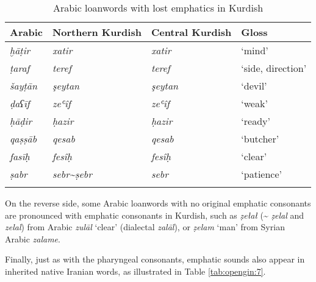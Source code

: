 \documentclass[output=paper]{langsci/langscibook}
\begin{document}
\begin{table}
\begin{tabular}{llll}
\lsptoprule
{Arabic} & {Northern Kurdish} & {Central Kurdish} & {Gloss}\\\midrule
\textit{ḫāṭir}  & \textit{xatir}                           & \textit{xatir}  & ‘mind’\\
\textit{ṭaraf}  & \textit{teref}                           & \textit{teref}  & ‘side, direction’\\
\textit{šayṭān} & \textit{şeytan}                          & \textit{şeytan} & ‘devil’\\
\textit{ḍaʕīf}  & \textit{zeʿîf}                           & \textit{zeʿîf}  & ‘weak’\\
\textit{ḥāḍir}  & \textit{ḥazir}                           & \textit{ḥazir}  & ‘ready’  \\
\textit{qaṣṣāb} & \textit{qesab}                           & \textit{qesab}  & ‘butcher’\\
\textit{fasīḥ}  & \textit{fesîḥ}                           & \textit{fesîḥ}  & ‘clear’\\
\textit{ṣabr}   & \textit{sebr{\textasciitilde}ṣebr}       & \textit{sebr}   & ‘patience’\\
\lspbottomrule
\end{tabular}
\caption{\label{bkm:Ref14707500}Arabic loanwords with lost emphatics in Kurdish\label{tab:opengin:6}}
\end{table}

On the reverse side, some Arabic loanwords with no original emphatic consonants are pronounced with emphatic consonants in Kurdish, such as \textit{ẓełał} ({\textasciitilde} \textit{ẓelal} and \textit{zelal}) from Arabic \textit{zulāl} ‘clear’ (dialectal \textit{zalāl}), or \textit{ẓelam} ‘man’ from Syrian Arabic \textit{zalame}.    

Finally, just as with the pharyngeal consonants, emphatic sounds also appear in inherited native Iranian words, as illustrated in Table \ref{tab:opengin:7}. 
\end{document}
